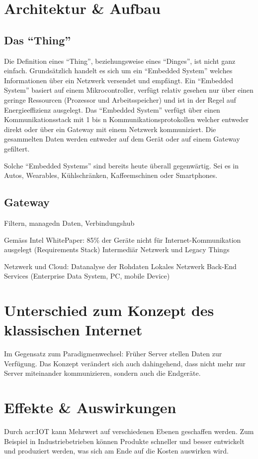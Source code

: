\section{Architektur \& Aufbau}


\subsection{Das "`Thing"'}
Die Definition eines "`Thing"', beziehungsweise eines "`Dinges"', ist nicht ganz einfach. Grundsätzlich handelt es sich um ein "`Embedded System"' welches Informationen über ein Netzwerk versendet und empfängt. Ein "`Embedded System"' basiert auf einem Mikrocontroller, verfügt relativ gesehen nur über einen geringe Ressourcen (Prozessor und Arbeitsspeicher) und ist in der Regel auf Energieeffizienz ausgelegt. Das "`Embedded System"' verfügt über einen Kommunikationsstack mit 1 bis n Kommunikationsprotokollen welcher entweder direkt oder über ein Gateway mit einem Netzwerk kommuniziert. Die gesammelten Daten werden entweder auf dem Gerät oder auf einem Gateway gefiltert. 

Solche "`Embedded Systems"' sind bereits heute überall gegenwärtig. Sei es in Autos, Wearables, Kühlschränken, Kaffeemschinen oder Smartphones.


\subsection{Gateway}
Filtern, managedn Daten, Verbindungshub

Gemäss Intel WhitePaper: 85\% der Geräte nicht für Internet-Kommunikation ausgelegt (Requirements Stack)
Intermediär Netzwerk und Legacy Things


Netzwerk und Cloud: Datanalyse der Rohdaten
Lokales Netzwerk
Back-End Services (Enterprise Data System, PC, mobile Device)



\section{Unterschied zum Konzept des klassischen Internet}
Im Gegensatz zum 
Paradigmenwechsel: Früher Server stellen Daten zur Verfügung.
Das Konzept verändert sich auch dahingehend, dass nicht mehr nur Server miteinander kommunizieren, sondern auch die Endgeräte.

\section{Effekte \& Auswirkungen}
Durch \gls{acr:IOT} kann Mehrwert auf verschiedenen Ebenen geschaffen werden. Zum Beispiel in Industriebetrieben können Produkte schneller und besser entwickelt und produziert werden, was sich am Ende auf die Kosten auswirken wird.

